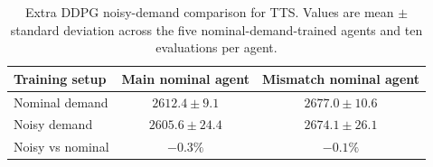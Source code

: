 \begin{table}[htbp]
\centering
\caption{Extra DDPG noisy-demand comparison for TTS. Values are mean $\pm$ standard deviation across the five nominal-demand-trained agents and ten evaluations per agent.}
\label{tab:extra_tts_comparison}
\begin{tabular}{lcc}
\toprule
Training setup & Main nominal agent & Mismatch nominal agent \\
\midrule
Nominal demand & $2612.4 \pm 9.1$ & $2677.0 \pm 10.6$ \\
Noisy demand & $2605.6 \pm 24.4$ & $2674.1 \pm 26.1$ \\
\midrule
Noisy vs nominal & $-0.3\%$ & $-0.1\%$ \\
\bottomrule
\end{tabular}
\end{table}

